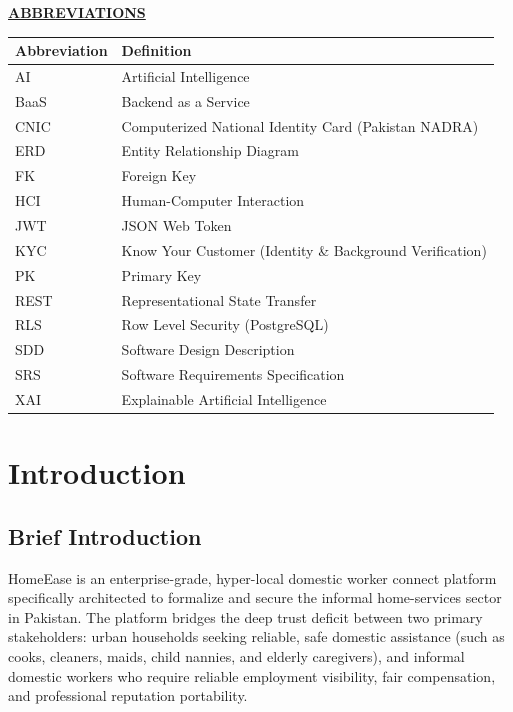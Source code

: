 \documentclass[12pt,a4paper]{article}
\makeatletter
\newcommand{\TocUnderlineEntry}{\@ifnextchar\numberline{\TocUnderlineNumbered}{\TocUnderlineUnnumbered}}
\def\TocUnderlineNumbered\numberline#1#2\TocUnderlineEnd{\numberline{#1}\uline{#2}}
\def\TocUnderlineUnnumbered#1\TocUnderlineEnd{\uline{#1}}
\makeatother
\begin{document}
\clearpage
{\centering\bfseries\underline{ABBREVIATIONS}\par}
\vspace{8pt}
\begingroup\small\setlength{\tabcolsep}{3pt}\renewcommand{\arraystretch}{1.15}
\begin{longtable}{|>{\raggedright\arraybackslash}p{\dimexpr(\linewidth-4\tabcolsep-3\arrayrulewidth)/2\relax}|>{\raggedright\arraybackslash}p{\dimexpr(\linewidth-4\tabcolsep-3\arrayrulewidth)/2\relax}|}
\hline
\textbf{Abbreviation} & \textbf{Definition} \\ \hline
AI & Artificial Intelligence \\ \hline
BaaS & Backend as a Service \\ \hline
CNIC & Computerized National Identity Card (Pakistan NADRA) \\ \hline
ERD & Entity Relationship Diagram \\ \hline
FK & Foreign Key \\ \hline
HCI & Human-Computer Interaction \\ \hline
JWT & JSON Web Token \\ \hline
KYC & Know Your Customer (Identity \& Background Verification) \\ \hline
PK & Primary Key \\ \hline
REST & Representational State Transfer \\ \hline
RLS & Row Level Security (PostgreSQL) \\ \hline
SDD & Software Design Description \\ \hline
SRS & Software Requirements Specification \\ \hline
XAI & Explainable Artificial Intelligence \\ \hline
\end{longtable}
\endgroup

\clearpage
{\setlength{\parskip}{0pt}
\let\OriginalTocContentsLine\contentsline
\renewcommand{\contentsline}[4]{\OriginalTocContentsLine{#1}{\TocUnderlineEntry#2\TocUnderlineEnd}{#3}{#4}}
\tableofcontents
}
\clearpage
{\setlength{\parskip}{0pt}\listoffigures}
\clearpage
{\setlength{\parskip}{0pt}\listoftables}
\clearpage
{}
\pagestyle{thesis}
\section{Introduction}
\subsection{Brief Introduction}
HomeEase is an enterprise-grade, hyper-local domestic worker connect platform specifically architected to formalize and secure the informal home-services sector in Pakistan. The platform bridges the deep trust deficit between two primary stakeholders: urban households seeking reliable, safe domestic assistance (such as cooks, cleaners, maids, child nannies, and elderly caregivers), and informal domestic workers who require reliable employment visibility, fair compensation, and professional reputation portability.
\end{document}

